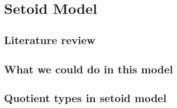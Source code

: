 \chapter{Setoid Model}



\section{Literature review}



\section{What we could do in this model}


\section{Quotient types in setoid model}

